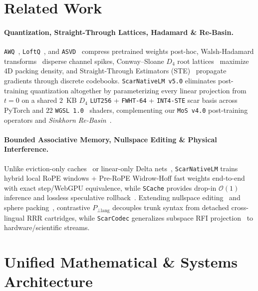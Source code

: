 \documentclass[10pt,twocolumn]{article}
\begin{document}
\section{Related Work}
\paragraph{Quantization, Straight-Through Lattices, Hadamard \& Re-Basin.}
\texttt{AWQ}~\citep{lin2024awq}, \texttt{LoftQ}~\citep{li2024loftq}, and \texttt{ASVD}~\citep{yuan2023asvd} compress pretrained weights post-hoc, Walsh-Hadamard transforms~\citep{walsh1923closed} disperse channel spikes, Conway--Sloane $D_4$ root lattices~\citep{conway1982fast} maximize 4D packing density, and Straight-Through Estimators (STE)~\citep{bengio2013estimating} propagate gradients through discrete codebooks. \texttt{ScarNativeLM v5.0} eliminates post-training quantization altogether by parameterizing every linear projection from $t=0$ on a shared $2$~KB $D_4$ \texttt{LUT256} + \texttt{FWHT-64} + \texttt{INT4-STE} scar basis across PyTorch and $22$ \texttt{WGSL 1.0}~\citep{w3c2024webgpu} shaders, complementing our \texttt{MoS v4.0} post-training operators and \emph{Sinkhorn Re-Basin}~\citep{ainsworth2023git,sinkhorn1967concerning,marchenko1967distribution}.

\paragraph{Bounded Associative Memory, Nullspace Editing \& Physical Interference.}
Unlike eviction-only caches~\citep{xiao2024efficient,zhang2023h2o} or linear-only Delta nets~\citep{widrow1960adaptive,schlag2021linear,yang2024parallelizing}, \texttt{ScarNativeLM} trains hybrid local RoPE windows + Pre-RoPE Widrow-Hoff fast weights end-to-end with exact step/WebGPU equivalence, while \texttt{SCache} provides drop-in $\mathcal{O}(1)$ inference and lossless speculative rollback~\citep{leviathan2023fast}. Extending nullspace editing~\citep{meng2022locating,fang2025alphaedit} and sphere packing~\citep{kabatiansky1978bounds}, contrastive $P_{\perp\text{lang}}$ decouples trunk syntax from detached cross-lingual RRR cartridges, while \texttt{ScarCodec} generalizes subspace RFI projection~\citep{leshem2000multichannel} to hardware/scientific streams.

\section{Unified Mathematical \& Systems Architecture}
\end{document}
